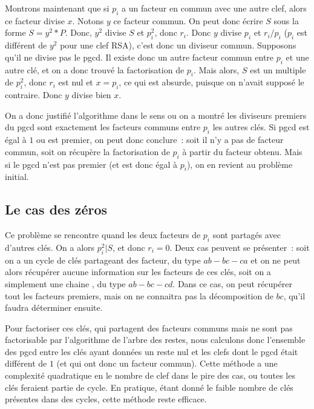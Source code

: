 \documentclass[a4paper,10pt]{article}
\begin{document}
  Montrons maintenant que si $p_i$ a un facteur en commun avec une autre clef, alors ce facteur divise $x$. Notons $y$ ce facteur commun. On peut donc écrire $S$ sous la forme $S = y^2*P$. Donc, $y^2$ divise $S$ et $p_i^2$, donc $r_i$.
  Donc $y$ divise $p_i$ et $r_i/p_i$ ($p_i$ est différent de $y^2$ pour une clef RSA), c'est donc un diviseur commun.
  Supposons qu'il ne divise pas le pgcd. Il existe donc un autre facteur commun entre $p_i$ et une autre clé, et on a donc trouvé la factorisation de $p_i$. Mais alors, $S$ est un multiple de $p_i^2$, donc $r_i$ est nul et $x = p_i$, ce qui est absurde, puisque on n'avait supposé le contraire. Donc $y$ divise bien $x$.
  
  On a donc justifié l'algorithme dans le sens ou on a montré les diviseurs premiers du pgcd sont exactement les facteurs communs entre $p_i$ les autres clés. Si pgcd est égal à $1$ ou est premier, on peut donc conclure~: soit il n'y a pas de facteur commun, soit on récupère la factorisation de $p_i$ à partir du facteur obtenu. Mais si le pgcd n'est pas premier (et est donc égal à $p_i$), on en revient au problème initial.
  
   \subsection{Le \og{}cas des zéros\fg}
  
   Ce problème se rencontre quand les deux facteurs de $p_i$ sont partagés avec d'autres clés. On a alors $p_i^2 | S$, et donc $r_i = 0$. Deux cas peuvent se présenter~: soit on a un \og{} cycle \fg{} de clés partageant des facteur, du type $ab - bc - ca$ et on ne peut alors récupérer aucune information sur les facteurs de ces clés, soit on a simplement une \og{} chaine \fg, du type $ab - bc - cd$. Dans ce cas, on peut récupérer tout les facteurs premiers, mais on ne connaitra pas la décomposition de $bc$, qu'il faudra déterminer ensuite.
  
  Pour factoriser ces clés, qui partagent des facteurs communs mais ne sont pas factorisable par l'algorithme de l'arbre des restes, nous calculons donc l'ensemble des pgcd entre les clés ayant données un reste nul et les clefs dont le pgcd était différent de $1$ (et qui ont donc un facteur commun). Cette méthode a une complexité quadratique en le nombre de clef dans le pire des cas, ou toutes les clés feraient partie de cycle. En pratique, étant donné le faible nombre de clés présentes dans des cycles, cette méthode reste efficace.
  
\end{document}
